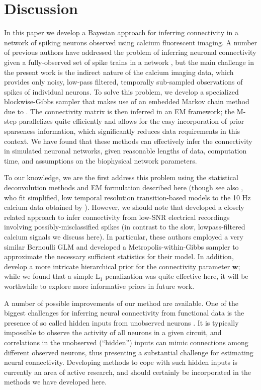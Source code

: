 \documentclass[aoas,preprint]{imsart}
\newcommand{\w}{w}
\newcommand{\bw}{\mathbf{\w}}
\begin{document}
\section{Discussion}
\label{sec:discussion}
In this paper we develop a Bayesian approach for inferring
connectivity in a network of spiking neurons observed using calcium
fluorescent imaging.  A number of previous authors have addressed the
problem of inferring neuronal connectivity given a fully-observed set
of spike trains in a network
\cite{BRIL88,CSK88,BRIL92,PAN03d,PAN04c,TRUC05,Rigat06,NYK06,KP06,Vidne08,Stevenson2009,Garofalo09},
but the main challenge in the present work is the indirect nature of
the calcium imaging data, which provides only noisy, low-pass
filtered, temporally sub-sampled observations of spikes of individual
neurons.  To solve this problem, we develop a specialized
blockwise-Gibbs sampler that makes use of an embedded Markov chain
method due to \cite{NBR03}.  The connectivity matrix is then inferred
in an EM framework; the M-step parallelizes quite efficiently and
allows for the easy incorporation of prior sparseness information,
which significantly reduces data requirements in this context.  We
have found that these methods can effectively infer the connectivity
in simulated neuronal networks, given reasonable lengths of data,
computation time, and assumptions on the biophysical network
parameters.

To our knowledge, we are the first address this problem using the
statistical deconvolution methods and EM formulation described here
(though see also \cite{Roxin08}, who fit simplified, low temporal
resolution transition-based models to the 10 Hz calcium data obtained
by \cite{IkegayaYuste04}).  However, we should note that
\cite{Rigat06} developed a closely related approach to infer
connectivity from low-SNR electrical recordings involving
possibly-misclassified spikes (in contrast to the slow,
lowpass-filtered calcium signals we discuss here).  In particular,
these authors employed a very similar Bernoulli GLM and developed a
Metropolis-within-Gibbs sampler to approximate the necessary
sufficient statistics for their model.  In addition, \cite{Rigat06}
develop a more intricate hierarchical prior for the connectivity
parameter $\bw$; while we found that a simple L$_1$ penalization was
quite effective here, it will be worthwhile to explore more
informative priors in future work.

A number of possible improvements of our method are available. One of the biggest challenges for inferring neural connectivity from functional data is the presence of so called hidden inputs from unobserved neurons \cite{Nykamp05,NYK06,KP06,Vidne08,Vakorin09}. It is typically impossible to observe the activity of all neurons in a given circuit, and correlations in the unobserved (``hidden'') inputs can mimic connections among different observed neurons, thus presenting a substantial challenge for estimating neural connectivity. Developing methods to cope with such hidden inputs is currently an area of active research, and should certainly be incorporated in the methods we have developed here. 
\end{document}
